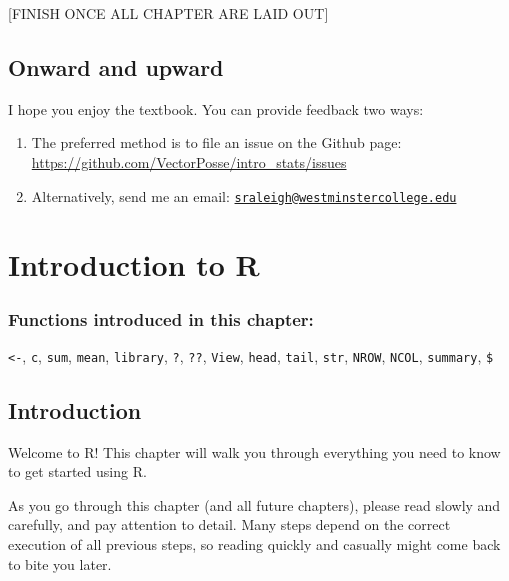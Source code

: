 \documentclass[
]{book}
\begin{document}
{[}FINISH ONCE ALL CHAPTER ARE LAID OUT{]}

\hypertarget{intro-onward}{%
\section*{Onward and upward}\label{intro-onward}}

I hope you enjoy the textbook. You can provide feedback two ways:

\begin{enumerate}
\def\labelenumi{\arabic{enumi}.}
\item
  The preferred method is to file an issue on the Github page: \url{https://github.com/VectorPosse/intro_stats/issues}
\item
  Alternatively, send me an email: \href{mailto:sraleigh@westminstercollege.edu}{\nolinkurl{sraleigh@westminstercollege.edu}}
\end{enumerate}

\hypertarget{intror}{%
\chapter{Introduction to R}\label{intror}}

\hypertarget{functions-introduced-in-this-chapter}{%
\subsection*{Functions introduced in this chapter:}\label{functions-introduced-in-this-chapter}}

\texttt{\textless{}-}, \texttt{c}, \texttt{sum}, \texttt{mean}, \texttt{library}, \texttt{?}, \texttt{??}, \texttt{View}, \texttt{head}, \texttt{tail}, \texttt{str}, \texttt{NROW}, \texttt{NCOL}, \texttt{summary}, \texttt{\$}

\hypertarget{intror-intro}{%
\section{Introduction}\label{intror-intro}}

Welcome to R! This chapter will walk you through everything you need to know to get started using R.

As you go through this chapter (and all future chapters), please read slowly and carefully, and pay attention to detail. Many steps depend on the correct execution of all previous steps, so reading quickly and casually might come back to bite you later.
\end{document}

